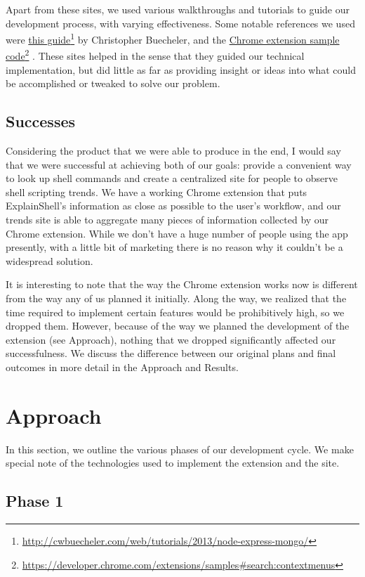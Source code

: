 \documentclass[11pt]{article}
\newcommand\fnurl[2]{%
\href{#1}{#2}\footnote{\url{#1}}%
}
\begin{document}
Apart from these sites, we used various walkthroughs and tutorials to guide our
development process, with varying effectiveness. Some notable references we used
were \fnurl{http://cwbuecheler.com/web/tutorials/2013/node-express-mongo/}{this
guide} by Christopher Buecheler, and the
\fnurl{https://developer.chrome.com/extensions/samples\#search:contextmenus}%
{Chrome extension sample code}. These sites helped in the sense that they guided
our technical implementation, but did little as far as providing insight or
ideas into what could be accomplished or tweaked to solve our problem.

\subsection{Successes}

Considering the product that we were able to produce in the end, I would say
that we were successful at achieving both of our goals: provide a convenient
way to look up shell commands and create a centralized site for people to
observe shell scripting trends. We have a working Chrome extension that puts
ExplainShell's information as close as possible to the user's workflow, and our
trends site is able to aggregate many pieces of information collected by our
Chrome extension. While we don't have a huge number of people using the app
presently, with a little bit of marketing there is no reason why it couldn't
be a widespread solution.

It is interesting to note that the way the Chrome extension works now is
different from the way any of us planned it initially. Along the way, we
realized that the time required to implement certain features would be
prohibitively high, so we dropped them. However, because of the way we planned
the development of the extension (see Approach), nothing that we dropped
significantly affected our successfulness. We discuss the difference between
our original plans and final outcomes in more detail in the Approach and
Results.

\section{Approach}

In this section, we outline the various phases of our development cycle. We make
special note of the technologies used to implement the extension and the site.

\subsection{Phase 1}
\end{document}
